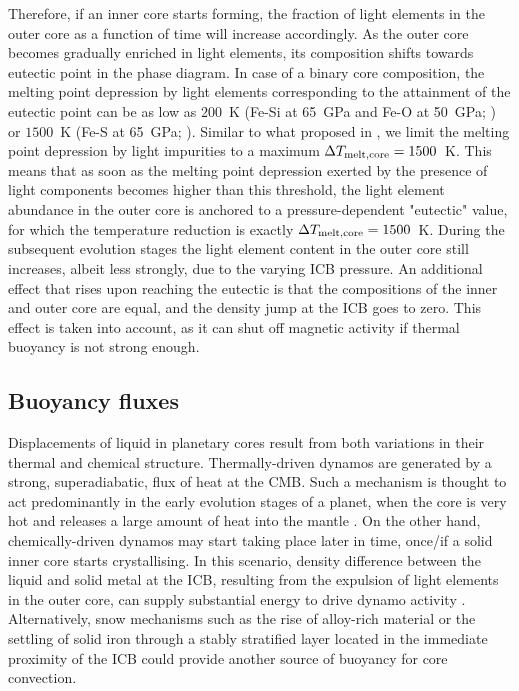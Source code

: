 \documentclass[draft]{agujournal2019} %
\begin{document}
Therefore, if an inner core starts forming, the fraction of light elements in the outer core as a function of time will increase accordingly. As the outer core becomes gradually enriched in light elements, its composition shifts towards eutectic point in the phase diagram. In case of a binary core composition, the melting point depression by light elements corresponding to the attainment of the eutectic point can be as low as $200$~K (Fe-Si at 65~GPa and Fe-O at 50~GPa; ) or $1500$~K (Fe-S at 65~GPa; ). Similar to what proposed in , we limit the melting point depression by light impurities to a maximum $\Delta T_{\rm melt,core}=1500$~K. This means that as soon as the melting point depression exerted by the presence of light components becomes higher than this threshold, the light element abundance in the outer core is anchored to a pressure-dependent "eutectic" value, for which the temperature reduction is exactly $\Delta T_{\rm melt,core}=1500$~K. During the subsequent evolution stages the light element content in the outer core still increases, albeit less strongly, due to the varying ICB pressure. An additional effect that rises upon reaching the eutectic is that the compositions of the inner and outer core are equal, and the density jump at the ICB goes to zero. This effect is taken into account, as it can shut off magnetic activity if thermal buoyancy is not strong enough. 

\subsection{Buoyancy fluxes}\label{sec:buoyancy_fluxes}

Displacements of liquid in planetary cores result from both variations in their thermal and chemical structure. Thermally-driven dynamos are generated by a strong, superadiabatic, flux of heat at the CMB. Such a mechanism is thought to act predominantly in the early evolution stages of a planet, when the core is very hot and releases a large amount of heat into the mantle \cite{del2020inner}. On the other hand, chemically-driven dynamos may start taking place later in time, once/if a solid inner core starts crystallising. In this scenario, density difference between the liquid and solid metal at the ICB, resulting from the expulsion of light elements in the outer core, can supply substantial energy to drive dynamo activity \cite{braginsky1963structure}. Alternatively, snow mechanisms such as the rise of alloy-rich material \cite{braginsky1963structure} or the settling of solid iron through a stably stratified layer \cite{hauck2006sulfur,ruckriemen2018top} located in the immediate proximity of the ICB could provide another source of buoyancy for core convection.  
\end{document}
